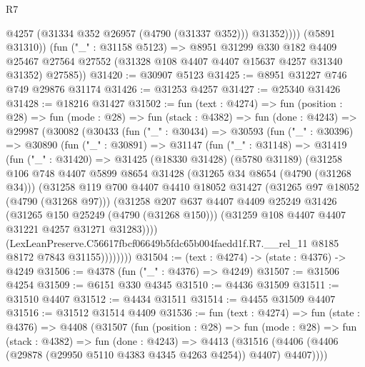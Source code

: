 \begin{lexlean}{R7}
\begin{coremodule}
                @4257
                (@31334 @352 @26957 (@4790 (@31337 @352)))
                @31352))))
        (@5891 @31310))
      (fun ("_" : @31158 @5123) =>
      @8951
        @31299
        @330
        @182
        @4409
        @25467
        @27564
        @27552
        (@31328 @108 @4407 @4407 @15637 @4257 @31340 @31352)
        @27585))
@31420 := @30907 @5123
@31425 := @8951 @31227 @746 @749 @29876 @31174
@31426 := @31253 @4257
@31427 := @25340 @31426
@31428 := @18216 @31427
@31502 := fun (text : @4274) =>
  fun (position : @28) =>
  fun (mode : @28) =>
  fun (stack : @4382) =>
  fun (done : @4243) =>
  @29987
    (@30082
      (@30433
        (fun ("_" : @30434) =>
        @30593
          (fun ("_" : @30396) =>
          @30890
            (fun ("_" : @30891) =>
            @31147
              (fun ("_" : @31148) =>
              @31419
                (fun ("_" : @31420) =>
                @31425
                  (@18330 @31428)
                  (@5780 @31189)
                  (@31258
                    @106
                    @748
                    @4407
                    @5899
                    @8654
                    @31428
                    (@31265 @34 @8654 (@4790 (@31268 @34)))
                    (@31258
                      @119
                      @700
                      @4407
                      @4410
                      @18052
                      @31427
                      (@31265 @97 @18052 (@4790 (@31268 @97)))
                      (@31258
                        @207
                        @637
                        @4407
                        @4409
                        @25249
                        @31426
                        (@31265 @150 @25249 (@4790 (@31268 @150)))
                        (@31259 @108 @4407 @4407 @31221 @4257 @31271 @31283))))
                  (LexLeanPreserve.C56617fbcf06649b5fdc65b004faedd1f.R7.__rel_11
                    @8185
                    @8172
                    @7843
                    @31155))))))))
@31504 := (text : @4274) -> (state : @4376) -> @4249
@31506 := @4378 (fun ("_" : @4376) => @4249)
@31507 := @31506 @4254
@31509 := @6151 @330 @4345
@31510 := @4436 @31509
@31511 := @31510 @4407
@31512 := @4434 @31511
@31514 := @4455 @31509 @4407
@31516 := @31512 @31514 @4409
@31536 := fun (text : @4274) =>
  fun (state : @4376) =>
  @4408
    (@31507
      (fun (position : @28) =>
      fun (mode : @28) =>
      fun (stack : @4382) =>
      fun (done : @4243) =>
      @4413 (@31516 (@4406 (@4406 (@29878 (@29950 @5110 @4383 @4345 @4263 @4254)) @4407) @4407))))

\end{coremodule}
\end{lexlean}
